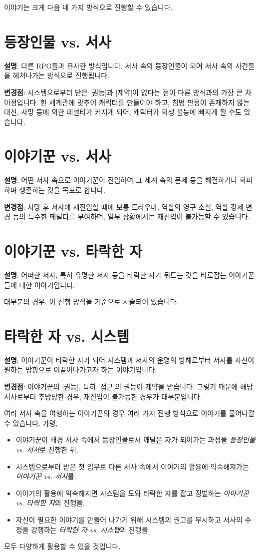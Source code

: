 \documentclass{report}
\begin{document}
	
	이야기는 크게 다음 네 가지 방식으로 진행할 수 있습니다.
	
	\section*{등장인물 vs. 서사}
	\textbf{설명}: 다른 RPG들과 유사한 방식입니다. 서사 속의 등장인물이 되어 서사 속의 사건들을 헤쳐나가는 방식으로 진행됩니다.
	
	\textbf{변경점}: 시스템으로부터 받은 [권능]과 [제약]이 없다는 점이 다른 방식과의 가장 큰 차이점입니다. 한 세계관에 맞추어 캐릭터를 만들어야 하고, 침범 판정이 존재하지 않는 대신, 사망 등에 의한 페널티가 커지게 되어, 캐릭터가 회생 불능에 빠지게 될 수도 있습니다.
	
	\section*{이야기꾼 vs. 서사}
	\textbf{설명}: 어떤 서사 속으로 이야기꾼이 진입하여 그 세계 속의 문제 등을 해결하거나 회피하며 생존하는 것을 목표로 합니다.
	
	\textbf{변경점}: 사망 후 서사에 재진입할 때에 보통 트라우마, 역할의 영구 소실, 역할 강제 변경 등의 특수한 페널티를 부여하며, 일부 상황에서는 재진입이 불가능할 수 있습니다.
	
	\section*{이야기꾼 vs. 타락한 자}
	\textbf{설명}: 어떠한 서사, 특히 유명한 서사 등을 타락한 자가 뒤트는 것을 바로잡는 이야기꾼들에 대한 이야기입니다.
	
	대부분의 경우, 이 진행 방식을 기준으로 서술되어 있습니다.
	
	\section*{타락한 자 vs. 시스템}
	\textbf{설명}: 이야기꾼이 타락한 자가 되어 시스템과 서사의 운명의 방해로부터 서사를 자신이 원하는 방향으로 이끌어나가고자 하는 이야기입니다.
	
	\textbf{변경점}: 이야기꾼의 [권능], 특히 [접근]의 권능이 제약을 받습니다. 그렇기 때문에 해당 서사로부터 추방당한 경우, 재진입이 불가능한 경우가 대부분입니다.
	
	\bigskip
	
	여러 서사 속을 여행하는 이야기꾼의 경우 여러 가지 진행 방식으로 이야기를 풀어나갈 수 있습니다. 가령,
	\begin{itemize}
		\item 이야기꾼이 배경 서사 속에서 등장인물로서 깨달은 자가 되어가는 과정을 \emph{등장인물 vs. 서사}로 진행한 뒤,
		\item 시스템으로부터 받은 첫 임무로 다른 서사 속에서 이야기의 활용에 익숙해져가는 \emph{이야기꾼 vs. 서사}를,
		\item 이야기의 활용에 익숙해지면 시스템을 도와 타락한 자를 잡고 징벌하는 \emph{이야기꾼 vs. 타락한 자}의 진행을,
		\item 자신이 필요한 이야기를 만들어 나가기 위해 시스템의 권고를 무시하고 서사의 수정을 강행하는 \emph{타락한 자 vs. 시스템}의 진행을
	\end{itemize}
	모두 다양하게 활용할 수 있을 것입니다.
	
\end{document}
